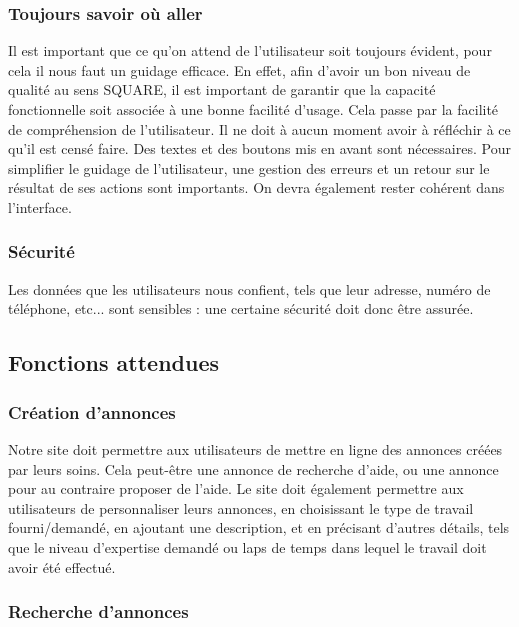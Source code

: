 \documentclass[a4paper,11pt]{article}
\begin{document}
\subsubsection{Toujours savoir où aller}

Il est important que ce qu’on attend de l’utilisateur soit toujours évident, pour cela il nous faut un
guidage efficace. En effet, afin d’avoir un bon niveau de qualité au sens SQUARE, il est important de
garantir que la capacité fonctionnelle soit associée à une bonne facilité d’usage. Cela passe par la
facilité de compréhension de l’utilisateur. Il ne doit à aucun moment avoir à réfléchir à ce qu’il est
censé faire. Des textes et des boutons mis en avant sont nécessaires. Pour simplifier le guidage de
l’utilisateur, une gestion des erreurs et un retour sur le résultat de ses actions sont importants. On
devra également rester cohérent dans l’interface.\\

\subsubsection{Sécurité}

Les données que les utilisateurs nous confient, tels que leur adresse, numéro de téléphone, etc... sont
sensibles : une certaine sécurité doit donc être assurée.\\

\subsection{Fonctions attendues}

\subsubsection{Création d’annonces}

Notre site doit permettre aux utilisateurs de mettre en ligne des annonces créées par leurs soins. Cela
peut-être une annonce de recherche d’aide, ou une annonce pour au contraire proposer de l’aide. Le
site doit également permettre aux utilisateurs de personnaliser leurs annonces, en choisissant le type
de travail fourni/demandé, en ajoutant une description, et en précisant d’autres détails, tels que le
niveau d’expertise demandé ou laps de temps dans lequel le travail doit avoir été effectué.\\

\subsubsection{Recherche d’annonces}
\end{document}
